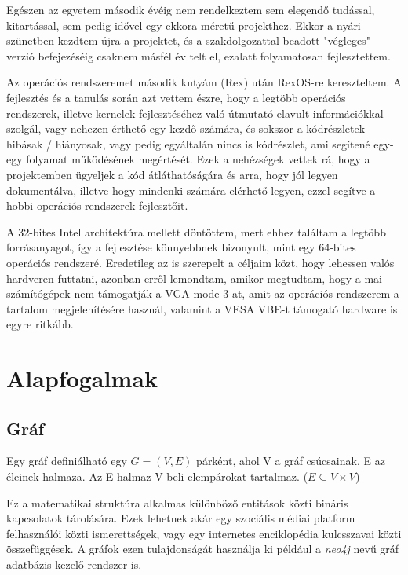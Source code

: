 \documentclass[12pt,numbers=noenddot]{report}
\begin{document}
Egészen az egyetem második évéig nem rendelkeztem sem elegendő tudással,
kitartással, sem pedig idővel egy ekkora méretű projekthez. Ekkor a nyári
szünetben kezdtem újra a projektet, és a szakdolgozattal beadott "végleges"
verzió befejezéséig csaknem másfél év telt el, ezalatt folyamatosan
fejlesztettem.

Az operációs rendszeremet második kutyám (Rex) után RexOS-re kereszteltem. A
fejlesztés és a tanulás során azt vettem észre, hogy a legtöbb operációs
rendszerek, illetve kernelek fejlesztéséhez való útmutató elavult információkkal
szolgál, vagy nehezen érthető egy kezdő számára, és sokszor a kódrészletek
hibásak / hiányosak, vagy pedig egyáltalán nincs is kódrészlet, ami segítené
egy-egy folyamat működésének megértését.
Ezek a nehézségek vettek rá, hogy a projektemben ügyeljek a kód átláthatóságára
és arra, hogy jól legyen dokumentálva, illetve hogy mindenki számára elérhető
legyen, ezzel segítve a hobbi operációs rendszerek fejlesztőit.

A 32-bites Intel architektúra mellett döntöttem, mert ehhez találtam a legtöbb
forrásanyagot, így a fejlesztése könnyebbnek bizonyult, mint egy 64-bites
operációs rendszeré. Eredetileg az is szerepelt a céljaim közt, hogy
lehessen valós hardveren futtatni, azonban erről lemondtam, amikor megtudtam,
hogy a mai számítógépek nem támogatják a VGA mode 3-at, amit az operációs
rendszerem a tartalom megjelenítésére használ, valamint a VESA VBE-t támogató
hardware is egyre ritkább.


\chapter{Alapfogalmak}
\pagestyle{fancy}

\section{Gráf}

Egy gráf definiálható egy $G=(V,E)$ párként, ahol V a gráf csúcsainak, E az éleinek halmaza. Az E halmaz V-beli elempárokat tartalmaz. 
($E \subseteq V \times V$)

Ez a matematikai struktúra alkalmas különböző entitások közti bináris kapcsolatok tárolására. Ezek lehetnek akár egy szociális médiai platform felhasználói közti ismerettségek, vagy egy internetes enciklopédia kulcsszavai közti összefüggések. A gráfok ezen tulajdonságát használja ki például a \textit{neo4j} nevű gráf adatbázis kezelő rendszer is.
\end{document}
